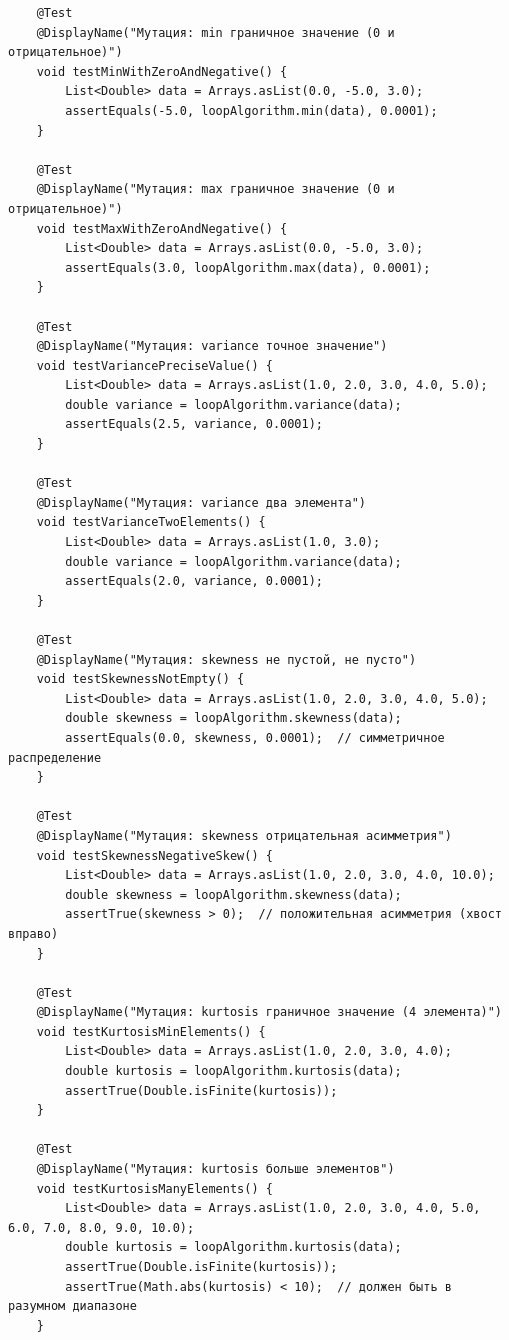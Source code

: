 \begin{verbatim}
    @Test
    @DisplayName("Мутация: min граничное значение (0 и отрицательное)")
    void testMinWithZeroAndNegative() {
        List<Double> data = Arrays.asList(0.0, -5.0, 3.0);
        assertEquals(-5.0, loopAlgorithm.min(data), 0.0001);
    }

    @Test
    @DisplayName("Мутация: max граничное значение (0 и отрицательное)")
    void testMaxWithZeroAndNegative() {
        List<Double> data = Arrays.asList(0.0, -5.0, 3.0);
        assertEquals(3.0, loopAlgorithm.max(data), 0.0001);
    }

    @Test
    @DisplayName("Мутация: variance точное значение")
    void testVariancePreciseValue() {
        List<Double> data = Arrays.asList(1.0, 2.0, 3.0, 4.0, 5.0);
        double variance = loopAlgorithm.variance(data);
        assertEquals(2.5, variance, 0.0001);
    }

    @Test
    @DisplayName("Мутация: variance два элемента")
    void testVarianceTwoElements() {
        List<Double> data = Arrays.asList(1.0, 3.0);
        double variance = loopAlgorithm.variance(data);
        assertEquals(2.0, variance, 0.0001);
    }

    @Test
    @DisplayName("Мутация: skewness не пустой, не пусто")
    void testSkewnessNotEmpty() {
        List<Double> data = Arrays.asList(1.0, 2.0, 3.0, 4.0, 5.0);
        double skewness = loopAlgorithm.skewness(data);
        assertEquals(0.0, skewness, 0.0001);  // симметричное распределение
    }

    @Test
    @DisplayName("Мутация: skewness отрицательная асимметрия")
    void testSkewnessNegativeSkew() {
        List<Double> data = Arrays.asList(1.0, 2.0, 3.0, 4.0, 10.0);
        double skewness = loopAlgorithm.skewness(data);
        assertTrue(skewness > 0);  // положительная асимметрия (хвост вправо)
    }

    @Test
    @DisplayName("Мутация: kurtosis граничное значение (4 элемента)")
    void testKurtosisMinElements() {
        List<Double> data = Arrays.asList(1.0, 2.0, 3.0, 4.0);
        double kurtosis = loopAlgorithm.kurtosis(data);
        assertTrue(Double.isFinite(kurtosis));
    }

    @Test
    @DisplayName("Мутация: kurtosis больше элементов")
    void testKurtosisManyElements() {
        List<Double> data = Arrays.asList(1.0, 2.0, 3.0, 4.0, 5.0, 6.0, 7.0, 8.0, 9.0, 10.0);
        double kurtosis = loopAlgorithm.kurtosis(data);
        assertTrue(Double.isFinite(kurtosis));
        assertTrue(Math.abs(kurtosis) < 10);  // должен быть в разумном диапазоне
    }


\end{verbatim}
